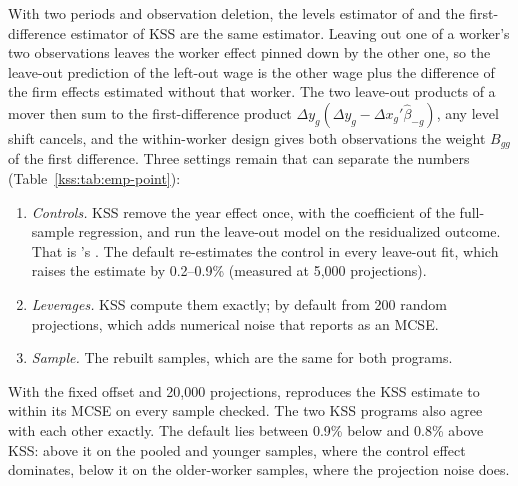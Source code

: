With two periods and observation deletion, the levels estimator of \fevc{} and the first-difference
estimator of KSS are the same estimator. Leaving out one of a worker's two observations leaves the worker
effect pinned down by the other one, so the leave-out prediction of the left-out wage is the other wage
plus the difference of the firm effects estimated without that worker. The two leave-out products of a
mover then sum to the first-difference product $\Delta y_g(\Delta y_g-\Delta x_g'\hat\beta_{-g})$, any
level shift cancels, and the within-worker design gives both observations the weight $B_{gg}$ of the
first difference. Three settings remain that can separate the numbers (Table~\ref{kss:tab:emp-point}):
\begin{enumerate}
\item \emph{Controls.} KSS remove the year effect once, with the coefficient of the full-sample
regression, and run the leave-out model on the residualized outcome. That is \fevc's
. The \fevc{} default re-estimates the control in every leave-out fit, which
raises the estimate by 0.2--0.9\% (measured at 5{,}000 projections).
\item \emph{Leverages.} KSS compute them exactly; \fevc{} by default from 200 random projections, which adds
numerical noise that \fevc{} reports as an MCSE.
\item \emph{Sample.} The rebuilt samples, which are the same for both programs.
\end{enumerate}
With the fixed offset and 20{,}000 projections, \fevc{} reproduces the KSS estimate to within its MCSE on
every sample checked. The two KSS programs also agree with each other exactly. The \fevc{} default lies
between 0.9\% below and 0.8\% above KSS: above it on the pooled and younger samples, where the control effect
dominates, below it on the older-worker samples, where the projection noise does.

